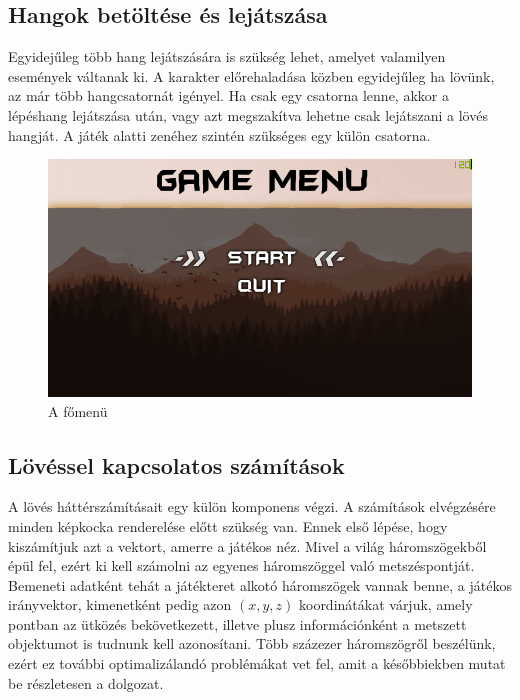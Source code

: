 \subsection{Hangok betöltése és lejátszása}

Egyidejűleg több hang lejátszására is szükség lehet, amelyet valamilyen események váltanak ki. A karakter előrehaladása közben egyidejűleg ha lövünk, az már több hangcsatornát igényel. Ha csak egy csatorna lenne, akkor a lépéshang lejátszása után, vagy azt megszakítva lehetne csak lejátszani a lövés hangját. A játék alatti zenéhez szintén szükséges egy külön csatorna.

\begin{figure}[h]
\centering
\includegraphics[scale=1.6]{kepek/menu.png}
\caption{A főmenü}
\label{fig:menu}
\end{figure}

\subsection{Lövéssel kapcsolatos számítások}

A lövés háttérszámításait egy külön komponens végzi. A számítások elvégzésére minden képkocka renderelése előtt szükség van. Ennek első lépése, hogy kiszámítjuk azt a vektort, amerre a játékos néz. Mivel a világ háromszögekből épül fel, ezért ki kell számolni az egyenes háromszöggel való metszéspontját. Bemeneti adatként tehát a játékteret alkotó háromszögek vannak benne, a játékos irányvektor, kimenetként pedig azon $(x, y, z)$ koordinátákat várjuk, amely pontban az ütközés bekövetkezett, illetve plusz információnként a metszett objektumot is tudnunk kell azonosítani. Több százezer háromszögről beszélünk, ezért ez további optimalizálandó problémákat vet fel, amit a későbbiekben mutat be részletesen a dolgozat.

